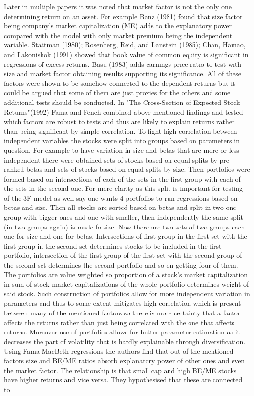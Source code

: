 \documentclass[a4paper,12pt]{article} %
\begin{document}
	Later in multiple papers it was noted that market factor is not the only one determining return on an asset. For example Banz (1981)\cite{bantz1981relationship} found that size factor being company's market capitalization (ME) adds to the explanatory power compared with the model with only market premium being the independent variable. Stattman (1980)\cite{stattman1980book}; Rosenberg, Reid, and Lanstein (1985)\cite{rosenberg1985persuasive};  Chan, Hamao, and Lakonishok (1991)\cite{chan1991fundamentals} showed that book value of common equity is significant in regressions of excess returns. Basu (1983)\cite{basu1983earnings} adds earnings-price ratio to test with size and market factor obtaining results supporting its significance. All of these factors were shown to be somehow connected to the dependent returns but it could be argued that some of them are just proxies for the others and some additional tests should be conducted. In "The Cross-Section of Expected Stock Returns"(1992)\cite{fama1992cross} Fama and Fench combined above mentioned findings and tested which factors are robust to tests and thus are likely to explain returns rather than being significant by simple correlation. To fight high correlation between independent variables the stocks were split into groups based on parameters in question. For example to have variation in size and betas that are more or less independent there were obtained sets of stocks based on equal splits by pre-ranked betas and sets of stocks based on equal splits by size. Then portfolios were formed based on intersections of each of the sets in the first group with each of the sets in the second one. For more clarity as this split is important for testing of the 3F model as well say one wants 4 portfolios to run regressions based on betas and size. Then all stocks are sorted based on betas and split in two one group with bigger ones and one with smaller, then independently the same split (in two groups again) is made fo size. Now there are two sets of two groups each one for size and one for betas. Intersections of first group in the first set with the first group in the second set determines stocks to be included in the first portfolio, intersection of the first group of the first set with the second group of the second set determines the second portfolio and so on getting four of them. The portfolios are value weighted so proportion of a stock's market capitalization in sum of stock market capitalizations of the whole portfolio determines weight of said stock. Such construction of portfolios allow for more independent variation in parameters and thus to some extent mitigates high correlation which is present between many of the mentioned factors so there is more certainty that a factor affects the returns rather than just being correlated with the one that affects returns. Moreover use of portfolios allows for better parameter estimation as it decreases the part of volatility that is hardly explainable through diversification. Using Fama-MacBeth regressions the authors find that out of the mentioned factors size and BE/ME ratios absorb explanatory power of other ones and even the market factor. The relationship is that small cap and high BE/ME stocks have higher returns and vice versa. They hypothesised that these are connected to 
\end{document}

